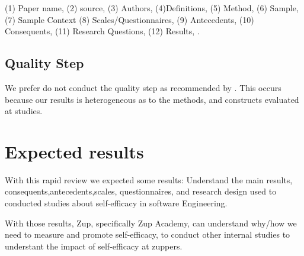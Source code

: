 \documentclass{TheMartianReport}
\begin{document}
(1) Paper name, (2) source, (3) Authors, (4)Definitions, (5) Method, (6) Sample, (7) Sample Context (8) Scales/Questionnaires, (9) Antecedents, (10) Consequents, (11) Research Questions, (12) Results, .


\subsection{Quality Step}

We prefer do not conduct the quality step as recommended by \cite{cartaxo2020rapid}. This occurs because our results is heterogeneous as to the methods, and constructs evaluated at studies. 

\section{Expected results}

With this rapid review we expected some results: Understand the main results, consequents,antecedents,scales, questionnaires, and research design used to conducted studies about self-efficacy in software Engineering.

With those results, Zup, 
specifically Zup Academy, can understand why/how we need to measure and promote self-efficacy,
 to conduct other internal studies to understant the impact of self-efficacy at zuppers. 







\end{document}
